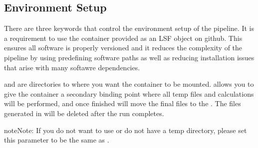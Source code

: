 \documentclass[letterpaper,10pt,english]{sphinxmanual}
\begin{document}
\begin{sphinxVerbatim}[commandchars=\\\{\}]
\end{sphinxVerbatim}


\subsection{Environment Setup}
\label{\detokenize{decipheringConfig:environment-setup}}
There are three keywords that control the environment setup of the pipeline. It is a requirement to use the container provided as an LSF object on github. This ensures all software is properly versioned and it reduces the complexity of the pipeline by using predefining software paths as well as reducing installation issues that arise with many softawre dependencies.

\begin{sphinxVerbatim}[commandchars=\\\{\}]
\end{sphinxVerbatim}

 and  are directories to where you want the container to be mounted.   allows you to give the container a secondary binding point where all temp files and calculations will be performed, and once finished will move the final files to the .  The files generated in  will be deleted after the run completes.

\begin{sphinxadmonition}{note}{Note:}
If you do not want to use or do not have a temp directory, please set this parameter to be the same as .
\end{sphinxadmonition}
\end{document}
